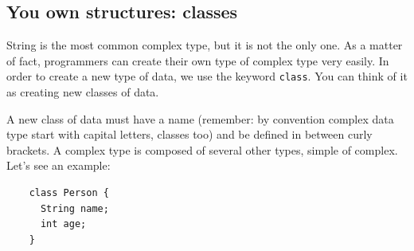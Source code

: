 






\subsection{You own structures: classes}
\label{sec:you-own-structures}

String is the most common complex type, but it is not the only one. As
a matter of fact, programmers can create their own type of complex
type very easily. In order to create a new type of data, we use the
keyword \verb+class+. You can think of it as creating new classes of
data. 

A new class of data must have a name (remember: by convention complex
data type start with capital letters, classes too) and be defined in
between curly brackets. A complex type is composed of several other
types, simple of complex. Let's see an example: 

\begin{verbatim}
    class Person {
      String name;
      int age;
    }
\end{verbatim}

